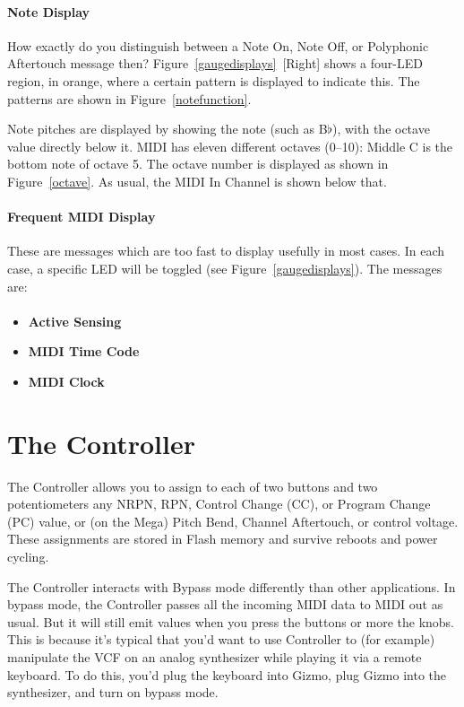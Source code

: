 \documentclass{article}
\begin{document}
\paragraph{Note Display}


How exactly do you distinguish between a Note On, Note Off, or Polyphonic Aftertouch message then?  Figure~{\ref{gaugedisplays}}~[Right] shows a four-LED region, in orange, where a certain pattern is displayed to indicate this.  The patterns are shown in Figure~\ref{notefunction}.

Note pitches are displayed by showing the note (such as B$\flat$), with the octave value directly below it.  MIDI has eleven different octaves (0--10): Middle C is the bottom note of octave 5.  The octave number is displayed as shown in Figure~\ref{octave}.  As usual, the MIDI In Channel is shown below that.


\paragraph{Frequent MIDI Display}  These are messages which are too fast to display usefully in most cases.  In each case, a specific LED will be toggled (see Figure~\ref{gaugedisplays}).  The messages are:

\paragraph{}\vspace{-2em}\begin{itemize}
\item {\bf Active Sensing}
\item {\bf MIDI Time Code}
\item {\bf MIDI Clock}
\end{itemize}


\clearpage
\section {The Controller}
\label{controller}

The Controller allows you to assign to each of two buttons and two potentiometers any NRPN, RPN, Control Change (CC), or Program Change (PC) value, or (on the Mega) Pitch Bend, Channel Aftertouch, or control voltage.  These assignments are stored in Flash memory and survive reboots and power cycling.

The Controller interacts with Bypass mode differently than other applications.  In bypass mode, the Controller passes all the incoming MIDI data to MIDI out as usual.  But it will still emit values when you press the buttons or more the knobs.  This is because it's typical that you'd want to use Controller to (for example) manipulate the VCF on an analog synthesizer while playing it via a remote keyboard.  To do this, you'd plug the keyboard into Gizmo, plug Gizmo into the synthesizer, and turn on bypass mode.
\end{document}

